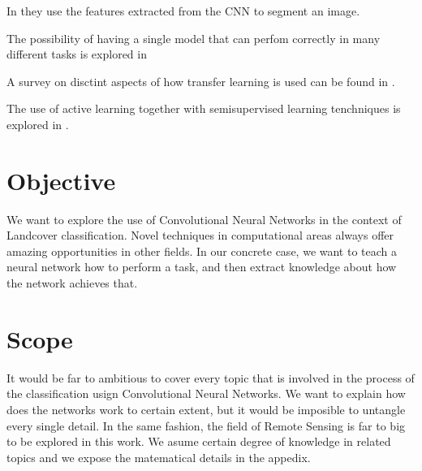 In \cite{DBLP:journals/corr/LongSD14} they use the features extracted from the CNN to segment an image.

The possibility of having a single model that can perfom correctly in many different tasks is explored in \cite{DBLP:journals/corr/KaiserGSVPJU17}

A survey on disctint aspects of how transfer learning is used can be found in \cite{5288526}.

The use of active learning together with semisupervised learning tenchniques is explored in \cite{7956153}.




\section{Objective}

We want to explore the use of Convolutional Neural Networks in the context of Landcover classification. Novel techniques in computational areas always offer amazing opportunities in other fields. In our concrete case, we want to teach a neural network how to perform a task, and then extract knowledge about how the network achieves that.



\section{Scope}

It would be far to ambitious to cover every topic that is involved in the process of the classification usign Convolutional Neural Networks. We want to explain how does the networks work to certain extent, but it would be imposible to untangle every single detail. In the same fashion, the field of Remote Sensing is far to big to be explored in this work. We asume certain degree of knowledge in related topics and we expose the matematical details in the appedix.